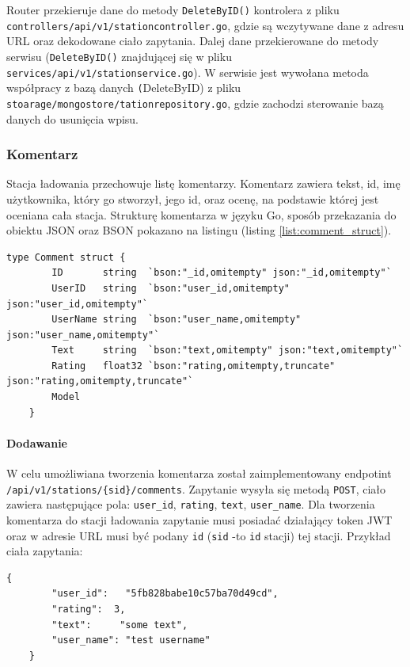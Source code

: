 Router przekieruje dane do metody \texttt{DeleteByID()} kontrolera z pliku \texttt{controllers/api/v1/stationcontroller.go}, gdzie są wczytywane dane z adresu URL oraz dekodowane ciało zapytania. Dalej dane przekierowane do metody serwisu (\texttt{DeleteByID()} znajdującej się w pliku \texttt{services/api/v1/stationservice.go}).
W serwisie jest wywołana metoda współpracy z bazą danych \texttt(DeleteByID) z pliku \texttt{stoarage/mongostore/tationrepository.go}, gdzie zachodzi sterowanie bazą danych do usunięcia wpisu.
\subsubsection{Komentarz}
Stacja ładowania przechowuje listę komentarzy. Komentarz zawiera tekst, id, imę użytkownika, który go stworzył, jego id, oraz ocenę, na podstawie której jest oceniana cała stacja.
Strukturę komentarza w języku Go, sposób przekazania do obiektu JSON oraz BSON pokazano na listingu (listing \ref{list:comment_struct}).
\begin{lstlisting}[label=list:comment_struct,caption=Struktura komentarza,basicstyle=\tiny\ttfamily]
    type Comment struct {
        ID       string  `bson:"_id,omitempty" json:"_id,omitempty"`
        UserID   string  `bson:"user_id,omitempty" json:"user_id,omitempty"`
        UserName string  `bson:"user_name,omitempty" json:"user_name,omitempty"`
        Text     string  `bson:"text,omitempty" json:"text,omitempty"`
        Rating   float32 `bson:"rating,omitempty,truncate" json:"rating,omitempty,truncate"`
        Model
    }
\end{lstlisting}

\paragraph{Dodawanie\newline}
W celu umożliwiana tworzenia komentarza został zaimplementowany endpotint \texttt{/api/v1/stations/\{sid\}/comments}.
Zapytanie wysyła się metodą \texttt{POST}, ciało zawiera następujące pola: \texttt{user\_id}, \texttt{rating}, \texttt{text}, \texttt{user\_name}.
Dla tworzenia komentarza do stacji ładowania zapytanie musi posiadać działający token JWT oraz w adresie URL musi być podany \texttt{id} (\texttt{sid} -to \texttt{id} stacji) tej stacji.
Przykład ciała zapytania:
\begin{lstlisting}[basicstyle=\tiny\ttfamily]
    {
		"user_id":   "5fb828babe10c57ba70d49cd",
		"rating":  3,
		"text":     "some text",
		"user_name": "test username"
    }
\end{lstlisting}


